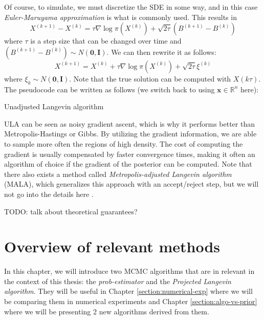 \documentclass[12pt]{memoir}
\newcommand{\mb}{\mathbf}
\newcommand{\ti}{\textit}
\begin{document}
Of course, to simulate, we must discretize the SDE in some way, and in this case \textit{Euler-Maruyama approximation} is what is commonly used. This results in
\begin{equation}
    X^{(k+1)} - X^{(k)} = \tau \nabla \log\pi(X^{(k)}) + \sqrt{2\tau}(B^{(k+1)} - B^{(k)})
\end{equation}
where $\tau$ is a step size that can be changed over time and $(B^{(k+1)} - B^{(k)}) \sim N(\mb 0, \mb I)$. We can then rewrite it as follows:
\begin{equation}
    X^{(k+1)} = X^{(k)} + \tau \nabla \log\pi(X^{(k)}) + \sqrt{2\tau}\xi^{(k)}
\end{equation}
where $\xi_k \sim N(\mb 0, \mb I)$. Note that the true solution can be computed with $X(k\tau)$. The pseudocode can be written as follows (we switch back to using $\mb x \in \mathbb{R}^n$ here):\medbreak
\begin{algorithm}[H]
    \DontPrintSemicolon

    \Input{$\mb x^{(0)}, K, B, \tau_{1:K}$}
    \Output{$\mb x^{(B+1)}, \mb x^{(B+2)}, \dots, \mb x^{(K)}$}
    \For{$k\gets 1:K$}{ 
        $\boldsymbol{\xi}^{(k)} \sim N(\mb 0, \mb I)$\;
        $\mb x^{(k+1)} = \mb x^{(k)} + \tau_k \nabla \log\pi(\mb x^{(k)}) + \sqrt{2\tau_k}\boldsymbol{\xi}^{(k)}$\;
    }
    \caption{Unadjusted Langevin algorithm}
\end{algorithm}\medbreak

ULA can be seen as noisy gradient ascent, which is why it performs better than Metropolis-Hastings or Gibbs. By utilizing the gradient information, we are able to sample more often the regions of high density. The cost of computing the gradient is usually compensated by faster convergence times, making it often an algorithm of choice if the gradient of the posterior can be computed. Note that there also exists a method called \textit{Metropolis-adjusted Langevin algorithm} (MALA), which generalizes this approach with an accept/reject step, but we will not go into the details here \cite{mcmc:langenvin-blog:Ansari2024Apr, wiki:MALA}.

TODO: talk about theoretical guarantees?

\chapter{Overview of relevant methods} \label{section:relevant-methods}
In this chapter, we will introduce two MCMC algorithms that are in relevant in the context of this thesis: the \ti{prob-estimator} and the \ti{Projected Langevin algorithm}. They will be useful in Chapter \ref{section:numerical-exp} where we will be comparing them in numerical experiments and Chapter \ref{section:algo-vs-prior} where we will be presenting 2 new algorithms derived from them.
\end{document}
